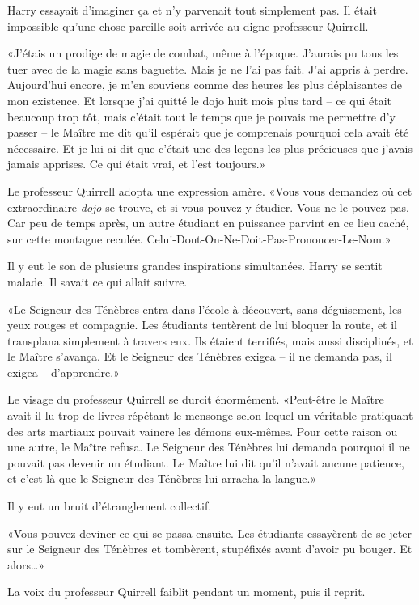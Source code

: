 Harry essayait d'imaginer ça et n'y parvenait tout simplement pas. Il était impossible qu'une chose pareille soit arrivée au digne professeur Quirrell.

«J'étais un prodige de magie de combat, même à l'époque. J'aurais pu tous les tuer avec de la magie sans baguette. Mais je ne l'ai pas fait. J'ai appris à perdre. Aujourd'hui encore, je m'en souviens comme des heures les plus déplaisantes de mon existence. Et lorsque j'ai quitté le dojo huit mois plus tard -- ce qui était beaucoup trop tôt, mais c'était tout le temps que je pouvais me permettre d'y passer -- le Maître me dit qu'il espérait que je comprenais pourquoi cela avait été nécessaire. Et je lui ai dit que c'était une des leçons les plus précieuses que j'avais jamais apprises. Ce qui était vrai, et l'est toujours.»

Le professeur Quirrell adopta une expression amère. «Vous vous demandez où cet extraordinaire \emph{dojo} se trouve, et si vous pouvez y étudier. Vous ne le pouvez pas. Car peu de temps après, un autre étudiant en puissance parvint en ce lieu caché, sur cette montagne reculée. Celui-Dont-On-Ne-Doit-Pas-Prononcer-Le-Nom.»

Il y eut le son de plusieurs grandes inspirations simultanées. Harry se sentit malade. Il savait ce qui allait suivre.

«Le Seigneur des Ténèbres entra dans l'école à découvert, sans déguisement, les yeux rouges et compagnie. Les étudiants tentèrent de lui bloquer la route, et il transplana simplement à travers eux. Ils étaient terrifiés, mais aussi disciplinés, et le Maître s'avança. Et le Seigneur des Ténèbres exigea -- il ne demanda pas, il exigea -- d'apprendre.»

Le visage du professeur Quirrell se durcit énormément. «Peut-être le Maître avait-il lu trop de livres répétant le mensonge selon lequel un véritable pratiquant des arts martiaux pouvait vaincre les démons eux-mêmes. Pour cette raison ou une autre, le Maître refusa. Le Seigneur des Ténèbres lui demanda pourquoi il ne pouvait pas devenir un étudiant. Le Maître lui dit qu'il n'avait aucune patience, et c'est là que le Seigneur des Ténèbres lui arracha la langue.»

Il y eut un bruit d'étranglement collectif.

«Vous pouvez deviner ce qui se passa ensuite. Les étudiants essayèrent de se jeter sur le Seigneur des Ténèbres et tombèrent, stupéfixés avant d'avoir pu bouger. Et alors…»

La voix du professeur Quirrell faiblit pendant un moment, puis il reprit.

